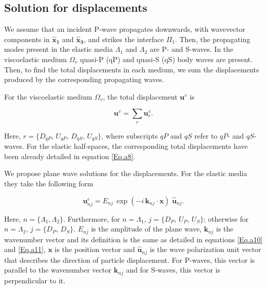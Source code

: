 \documentclass[draft]{agujournal2019}
\begin{document}
\subsection{Solution for displacements}
We assume that an incident P-wave propagates downwards, with wavevector components in $\bm{\hat x_1}$ and  $\bm{\hat x_3}$, and strikes the interface $\Pi_1$. Then, the propagating modes present in the elastic media $\Lambda_1$ and $\Lambda_2$ are P- and S-waves. In the viscoelastic medium $\Omega_v$ quasi-P (qP)  and quasi-S (qS) body waves are present. 
Then, to find the total displacements in each medium, we sum the displacements produced by the corresponding propagating waves.

For the viscoelastic medium $\Omega_v$, the total displacement $\bm{u}^v$ is
\begin{linenomath*}
\begin{equation}\label{Eq.b3}
\bm{u}^v=  \sum_r \bm{u}_{r}^v.
\end{equation}
\end{linenomath*}
Here, $r=\{D_{qP},\,U_{qP},\, D_{qS},\,U_{qS}\}$, where subscripts $qP$ and $qS$ refer to $qP$- and $qS$-waves.
For the elastic half-spaces, the corresponding total displacements have been already detailed in equation \eqref{Eq.a8}.

We propose plane wave solutions for the displacements. For the elastic media they take the following form
\begin{linenomath*}
\begin{equation}\label{Eq.b4}
\bm{u}_{nj}^e = E_{nj}\, \exp (- i \,\bm{k}_{nj} \cdot \bm {x} ) \; \bm{\hat {u}}_{nj}.
\end{equation}
\end{linenomath*}

Here, $n=\{ \Lambda_1,\Lambda_2 \}$. Furthermore, for $n =\Lambda_1 $,  $j=\{D_P,\,U_P,\,U_S\}$; otherwise for $n =\Lambda_2 $, $j=\{D_P,\,D_S\}$. $ E_{nj}$ is the amplitude of the plane wave,  $\bm{k}_{nj}$ is the 
wavenumber vector and its definition is the same as detailed in equations \eqref{Eq.a10} and \eqref{Eq.a11},
$\bm {x}$ is the position vector and $\bm{\hat {u}}_{nj}$ is the wave polarization unit vector that describes the direction of particle displacement. For P-waves, this vector is parallel to the wavenumber vector $\bm{k}_{nj}$ and for S-waves, this vector is perpendicular to it.
\end{document}
